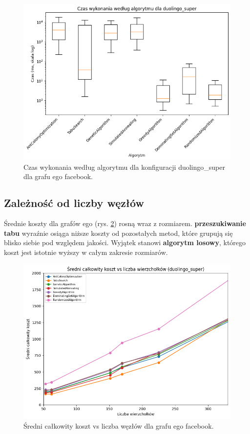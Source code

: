 \begin{figure}[H]
  \centering
  \includegraphics[width=0.7\linewidth]{assets/figures/facebook_time_boxplot.png}
  \caption{Czas wykonania według algorytmu dla konfiguracji duolingo\_super dla grafu ego facebook.}
  \label{fig:facebook_time_boxplot}
\end{figure}

\subsection{Zależność od liczby węzłów}

Średnie koszty dla grafów ego (rys. \ref{fig:facebook_cost_vs_nodes}) rosną wraz z rozmiarem. \textbf{przeszukiwanie tabu} wyraźnie osiąga niższe koszty od pozostałych metod, które grupują się blisko siebie pod względem jakości. Wyjątek stanowi \textbf{algorytm losowy}, którego koszt jest istotnie wyższy w całym zakresie rozmiarów.

\begin{figure}[H]
  \centering
  \includegraphics[width=0.7\linewidth]{assets/figures/facebook_cost_vs_nodes.png}
  \caption{Średni całkowity koszt vs liczba węzłów dla grafu ego facebook.}
  \label{fig:facebook_cost_vs_nodes}
\end{figure}

